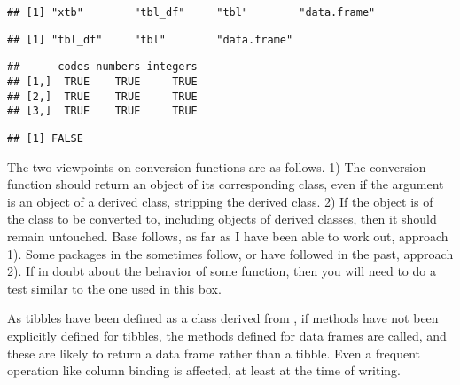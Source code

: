 \documentclass[krantz2]{krantz}\usepackage{knitr}
\begin{document}
\begin{explainbox}
\begin{knitrout}\footnotesize
{}\color{fgcolor}\begin{kframe}
\begin{alltt}
 \hlkwb{<-} 
 \hlkwb{<-} \hlstd{(}\hlstd{,} 
\end{alltt}
\begin{verbatim}
## [1] "xtb"        "tbl_df"     "tbl"        "data.frame"
\end{verbatim}
\begin{alltt}
 \hlkwb{<-} 
\end{alltt}
\begin{verbatim}
## [1] "tbl_df"     "tbl"        "data.frame"
\end{verbatim}
\begin{alltt}
 \hlopt{==} 
\end{alltt}
\begin{verbatim}
##      codes numbers integers
## [1,]  TRUE    TRUE     TRUE
## [2,]  TRUE    TRUE     TRUE
## [3,]  TRUE    TRUE     TRUE
\end{verbatim}
\begin{alltt}
\end{alltt}
\begin{verbatim}
## [1] FALSE
\end{verbatim}
\end{kframe}
\end{knitrout}

The two viewpoints on conversion functions are as follows. 1) The conversion function should return an object of its corresponding class, even if the argument is an object of a derived class, stripping the derived class. 2) If the object is of the class to be converted to, including objects of derived classes, then it should remain untouched. Base \Rlang follows, as far as I have been able to work out, approach 1). Some packages in the  sometimes follow, or have followed in the past, approach 2). If in doubt about the behavior of some function, then you will need to do a test similar to the one used in this box.

As tibbles have been defined as a class derived from , if methods have not been explicitly defined for tibbles, the methods defined for data frames are called, and these are likely to return a data frame rather than a tibble. Even a frequent operation like column binding is affected, at least at the time of writing.


\end{explainbox}
\end{document}
